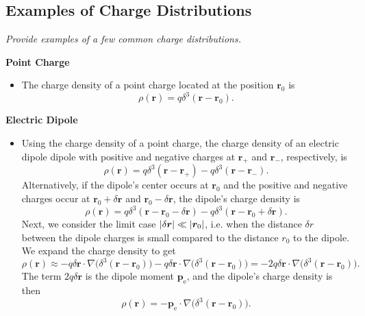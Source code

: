 \documentclass[11pt, a4paper]{article}
\renewcommand{\vec}[1]{\bm{#1}} %
\renewcommand{\r}{\vec{r}}
\newcommand{\pe}{\vec{p}_{\text{e}}}  %
\renewcommand{\grad}{\nabla}
\begin{document}
\subsection{Examples of Charge Distributions}
\textit{Provide examples of a few common charge distributions.}
    
\vspace{2mm}
\textbf{Point Charge} 
\begin{itemize}
	\item The charge density of a point charge located at the position $ \r_{0} $ is
	\begin{equation*}
		\rho (\r) = q \delta^{3}(\r - \r_{0}).
	\end{equation*}
\end{itemize}	
	

\textbf{Electric Dipole} 
\begin{itemize}
	\item Using the charge density of a point charge, the charge density of an electric dipole dipole with positive and negative charges at $ \r_{+} $ and $ \r_{-} $, respectively, is
	\begin{equation*}
		\rho(\r) = q \delta^{3}(\r - \r_{+}) - q \delta^{3}(\r - \r_{-}).
	\end{equation*}
	Alternatively, if the dipole's center occurs at $ \r_{0} $ and the positive and negative charges occur at $ \r_{0} + \delta \r$ and $ \r_{0} - \delta \r $, the dipole's charge density is
	\begin{equation*}
		\rho(\r) = q \delta^{3}(\r - \r_{0} - \delta \r) - q\delta^{3}(\r - \r_{0} + \delta \r).
	\end{equation*}
	Next, we consider the limit case $ \abs{\delta \r} \ll \abs{\r_{0}} $, i.e. when the distance $ \delta r $ between the dipole charges is small compared to the distance $ r_{0} $ to the dipole. We expand the charge density to get
	\begin{equation*}
		\rho(\r) \approx - q \delta \r \cdot \grad \big(\delta^{3}(\r - \r_{0})\big) - q \delta \r \cdot \grad \big(\delta^{3}(\r - \r_{0})\big) = -2 q \delta \r \cdot \grad \big(\delta^{3}(\r - \r_{0})\big).
	\end{equation*}
	The term $ 2q\delta \r $ is the dipole moment $ \pe $, and the dipole's charge density is then
	\begin{equation*}
		\rho(\r) = -\pe \cdot \grad \big(\delta^{3}(\r - \r_{0})\big).
	\end{equation*}

\end{itemize}
\end{document}
